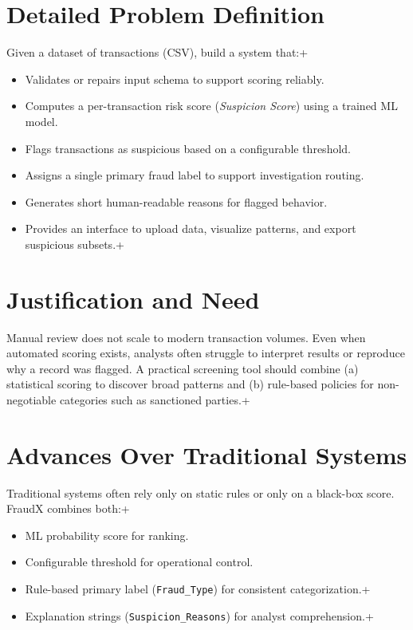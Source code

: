 \documentclass[12pt,a4paper]{report}
\begin{document}
\section{Detailed Problem Definition}
Given a dataset of transactions (CSV), build a system that:\n+\begin{itemize}
  \item Validates or repairs input schema to support scoring reliably.
  \item Computes a per-transaction risk score (\textit{Suspicion Score}) using a trained ML model.
  \item Flags transactions as suspicious based on a configurable threshold.
  \item Assigns a single primary fraud label to support investigation routing.
  \item Generates short human-readable reasons for flagged behavior.
  \item Provides an interface to upload data, visualize patterns, and export suspicious subsets.\n+\end{itemize}

\section{Justification and Need}
Manual review does not scale to modern transaction volumes. Even when automated scoring exists, analysts often struggle to interpret results or reproduce why a record was flagged. A practical screening tool should combine (a) statistical scoring to discover broad patterns and (b) rule-based policies for non-negotiable categories such as sanctioned parties.\n+
\section{Advances Over Traditional Systems}
Traditional systems often rely only on static rules or only on a black-box score. FraudX combines both:\n+\begin{itemize}
  \item ML probability score for ranking.
  \item Configurable threshold for operational control.
  \item Rule-based primary label (\texttt{Fraud\_Type}) for consistent categorization.\n+  \item Explanation strings (\texttt{Suspicion\_Reasons}) for analyst comprehension.\n+\end{itemize}
\end{document}
